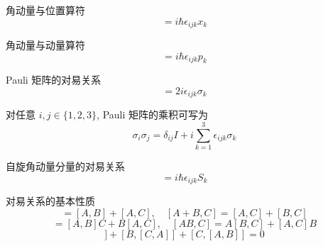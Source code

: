 角动量与位置算符
\begin{equation}
	[L_i, x_j] = i\hbar \epsilon_{ijk} x_k
\end{equation}

角动量与动量算符
\begin{equation}
	[L_i, p_j] = i\hbar \epsilon_{ijk} p_k
\end{equation}

Pauli 矩阵的对易关系
\begin{equation}
	[\sigma_i, \sigma_j] = 2i \epsilon_{ijk} \sigma_k
\end{equation}

对任意 \(i,j \in \{1,2,3\}\), Pauli 矩阵的乘积可写为
\[
\sigma_i \sigma_j = \delta_{ij} I + i\sum_{k=1}^3 \epsilon_{ijk}\sigma_k
\]

自旋角动量分量的对易关系
\begin{equation}
	[S_i, S_j] = i\hbar \epsilon_{ijk} S_k
\end{equation}

对易关系的基本性质
\begin{equation}
	[A, B + C] = [A, B] + [A, C], \quad [A + B, C] = [A, C] + [B, C] 
\end{equation}
\begin{equation}
	[A, BC] = [A, B]C + B[A, C], \quad [AB, C] = A[B, C] + [A, C]B
\end{equation}
\begin{equation}
	[A, [B, C]] + [B, [C, A]] + [C, [A, B]] = 0
\end{equation}